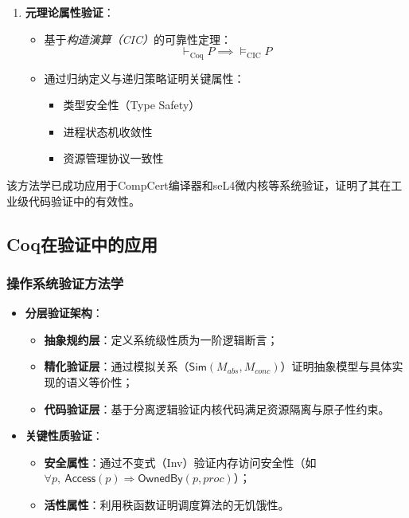 \begin{enumerate}[leftmargin=*,label=\textbf{\arabic*}.]
    \item \textbf{元理论属性验证}：
    \begin{itemize}
        \item 基于\emph{构造演算（CIC）}的可靠性定理：
            \begin{equation}
                \vdash_{\mathrm{Coq}} P \implies \models_{\mathrm{CIC}} P
            \end{equation}
        \item 通过归纳定义与递归策略证明关键属性：
            \begin{itemize}
                \item 类型安全性（Type Safety）
                \item 进程状态机收敛性
                \item 资源管理协议一致性
            \end{itemize}
    \end{itemize}
\end{enumerate}

该方法学已成功应用于CompCert编译器\cite{leroy2009formal}和seL4微内核\cite{klein2009sel4}等系统验证，证明了其在工业级代码验证中的有效性。

\subsection{Coq在验证中的应用}
\label{subsec:coq-applications}

\subsubsection{操作系统验证方法学}
\begin{itemize}
    \item \textbf{分层验证架构}：
    \begin{itemize}
        \item \textbf{抽象规约层}：定义系统级性质为一阶逻辑断言；
        \item \textbf{精化验证层}：通过模拟关系（$\mathsf{Sim}(M_{abs}, M_{conc})$）证明抽象模型与具体实现的语义等价性；
        \item \textbf{代码验证层}：基于分离逻辑验证内核代码满足资源隔离与原子性约束。
    \end{itemize}
    
    \item \textbf{关键性质验证}：
    \begin{itemize}
        \item \textbf{安全属性}：通过不变式（Inv）验证内存访问安全性（如%
        $\forall p,\>\mathsf{Access}(p) \mathrel{\Rightarrow} \mathsf{OwnedBy}(p, \mathit{proc})$）；
        \item \textbf{活性属性}：利用秩函数证明调度算法的无饥饿性。
    \end{itemize}
\end{itemize}

